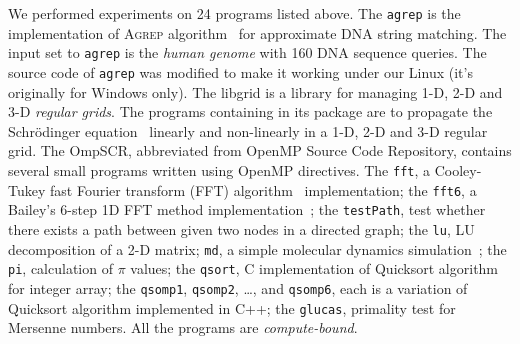We performed experiments on 24 programs listed above. The \texttt{agrep} is the implementation of \textsc{Agrep} algorithm~\cite{Wu:1991p1269} for approximate DNA string matching. The input set to \texttt{agrep} is the \textit{human genome} with 160 DNA sequence queries. The source code of \texttt{agrep} was modified to make it working under our Linux (it's originally for Windows only). The libgrid is a library for managing 1-D, 2-D and 3-D \textit{regular grids}. The programs containing in its package are to propagate the Schr\"odinger equation~\cite{Schrodinger:1926p1292} linearly and non-linearly in a 1-D, 2-D and 3-D regular grid. The OmpSCR, abbreviated from OpenMP Source Code Repository, contains several small programs written using OpenMP directives. The \texttt{fft}, a Cooley-Tukey fast Fourier transform (FFT) algorithm~\cite{Cooley:1965p1293} implementation; the \texttt{fft6}, a Bailey's 6-step 1D FFT method implementation~\cite{Bailey:1989p1295}; the \texttt{testPath}, test whether there exists a path between given two nodes in a directed graph; the \texttt{lu}, LU decomposition of a 2-D matrix; \texttt{md}, a simple molecular dynamics simulation~\cite{Swope:1982p1298}; the \texttt{pi}, calculation of $\pi$ values; the \texttt{qsort}, C implementation of Quicksort algorithm~\cite{Hoare:1962p1297} for integer array; the \texttt{qsomp1}, \texttt{qsomp2}, \dots, and \texttt{qsomp6}, each is a variation of Quicksort algorithm implemented in C++; the \texttt{glucas}, primality test for Mersenne numbers. All the programs are \textit{compute-bound}.

